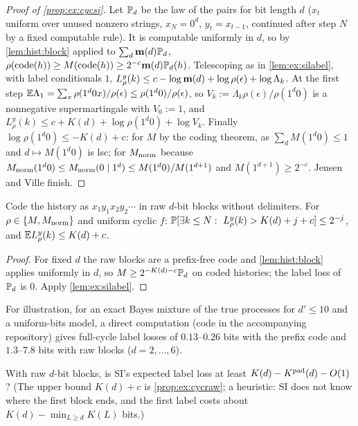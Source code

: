 \begin{proof}[Proof of \cref{prop:ex:cycsi}]
Let $\mathbb{P}_d$ be the law of the pairs for bit length $d$ ($x_t$ uniform over unused nonzero strings, $x_N=0^d$, $y_t=x_{t-1}$, continued after step $N$ by a fixed computable rule). It is computable uniformly in $d$, so by \cref{lem:hist:block} applied to $\sum_d\mathbf{m}(d)\mathbb{P}_d$, $\rho(\operatorname{code}(h))\ge M(\operatorname{code}(h))\ge2^{-c}\mathbf{m}(d)\mathbb{P}_d(h)$. Telescoping as in \cref{lem:ex:silabel}, with label conditionals $1$, $L^y_\rho(k)\le c-\log\mathbf{m}(d)+\log\rho(\epsilon)+\log\Lambda_k$. At the first step $\mathbb{E}\Lambda_1=\sum_x\rho(1^d0x)/\rho(\epsilon)\le\rho(1^d0)/\rho(\epsilon)$, so $V_k:=\Lambda_k\rho(\epsilon)/\rho(1^d0)$ is a nonnegative supermartingale with $V_0:=1$, and $L^y_\rho(k)\le c+K(d)+\log\rho(1^d0)+\log V_k$. Finally $\log\rho(1^d0)\le-K(d)+c$: for $M$ by the coding theorem, as $\sum_dM(1^d0)\le1$ and $d\mapsto M(1^d0)$ is lsc; for $M_{\mathrm{norm}}$ because $M_{\mathrm{norm}}(1^d0)\le M_{\mathrm{norm}}(0\mid1^d)\le M(1^d0)/M(1^{d+1})$ and $M(1^{d+1})\ge2^{-c}$. Jensen and Ville finish.
\end{proof}

\begin{proposition}\label{prop:ex:cycraw}
Code the history as $x_1y_1x_2y_2\cdots$ in raw $d$-bit blocks without delimiters. For $\rho\in\{M,M_{\mathrm{norm}}\}$ and uniform cyclic $f$: $\Prob[\exists k\le N:\ L^y_\rho(k)>K(d)+j+c]\le2^{-j}$, and $\mathbb{E} L^y_\rho(k)\le K(d)+c$.
\end{proposition}

\begin{proof}
For fixed $d$ the raw blocks are a prefix-free code and \cref{lem:hist:block} applies uniformly in $d$, so $M\ge2^{-K(d)-c}\mathbb{P}_d$ on coded histories; the label loss of $\mathbb{P}_d$ is $0$. Apply \cref{lem:ex:silabel}.
\end{proof}

For illustration, for an exact Bayes mixture of the true processes for $d'\le10$ and a uniform-bits model, a direct computation (code in the accompanying repository) gives full-cycle label losses of $0.13$--$0.26$ bits with the prefix code and $1.3$--$7.8$ bits with raw blocks ($d=2,\dots,6$).

\begin{question}\label{conj:ex:raw}
With raw $d$-bit blocks, is SI's expected label loss at least $K(d)-K^{\mathrm{pad}}(d)-O(1)$? (The upper bound $K(d)+c$ is \cref{prop:ex:cycraw}; a heuristic: SI does not know where the first block ends, and the first label costs about $K(d)-\min_{L\ge d}K(L)$ bits.)
\end{question}

